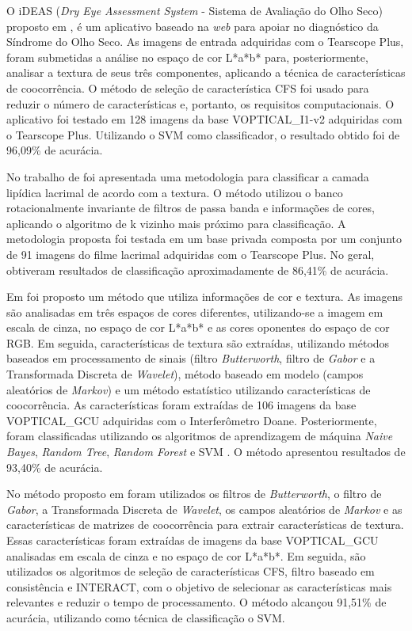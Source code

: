 O iDEAS (\textit{Dry Eye Assessment System} - Sistema de Avaliação do Olho Seco) proposto em , é um aplicativo baseado na \textit{web} para apoiar no diagnóstico da Síndrome do Olho Seco. As imagens de entrada adquiridas com o Tearscope Plus, foram submetidas a análise no espaço de cor L*a*b* para, posteriormente, analisar a textura de seus três componentes, aplicando a técnica de características de coocorrência. O método de seleção de característica CFS foi usado para reduzir o número de características e, portanto, os requisitos computacionais. O aplicativo foi testado em 128 imagens da base VOPTICAL\_I1-v2 \cite{voptical_gcuvarpa_i1-v2} adquiridas com o Tearscope Plus. Utilizando o SVM como classificador, o resultado obtido foi de 96,09\% de acurácia.

No trabalho de  foi apresentada uma metodologia para classificar a camada lipídica lacrimal de acordo com a textura. O método utilizou o banco rotacionalmente invariante de filtros de passa banda e informações de cores, aplicando o algoritmo de k vizinho mais próximo \cite{nasrabadi2007pattern} para classificação. A metodologia proposta foi testada em um base privada composta por um conjunto de 91 imagens do filme lacrimal adquiridas com o Tearscope Plus. No geral, obtiveram resultados de classificação aproximadamente de 86,41\% de acurácia.

Em  foi proposto um método que utiliza informações de cor e textura. As imagens são analisadas em três espaços de cores diferentes, utilizando-se a imagem em escala de cinza, no espaço de cor L*a*b* e as cores oponentes do espaço de cor RGB. Em seguida, características de textura são extraídas, utilizando métodos baseados em processamento de sinais (filtro \textit{Butterworth}, filtro de \textit{Gabor} e a Transformada Discreta de \textit{Wavelet}), método baseado em modelo (campos aleatórios de \textit{Markov}) e um método estatístico utilizando características de coocorrência. As características foram extraídas de 106 imagens da base VOPTICAL\_GCU \cite{voptical_gcuvarpa2013} adquiridas com o Interferômetro Doane. Posteriormente, foram classificadas utilizando os algoritmos de aprendizagem de máquina \textit{Naive Bayes}, \textit{Random Tree}, \textit{Random Forest} e SVM \cite{dean2014big}. O método apresentou resultados de 93,40\% de acurácia.

No método proposto em  foram utilizados os filtros de \textit{Butterworth}, o filtro de \textit{Gabor}, a Transformada Discreta de \textit{Wavelet}, os campos aleatórios de \textit{Markov} e as características de matrizes de coocorrência para extrair características de textura. Essas características foram extraídas de imagens da base VOPTICAL\_GCU analisadas em escala de cinza e no espaço de cor L*a*b*. Em seguida, são utilizados os algoritmos de seleção de características CFS, filtro baseado em consistência e INTERACT, com o objetivo de selecionar as características mais relevantes e reduzir o tempo de processamento. O método alcançou 91,51\% de acurácia, utilizando como técnica de classificação o SVM.

